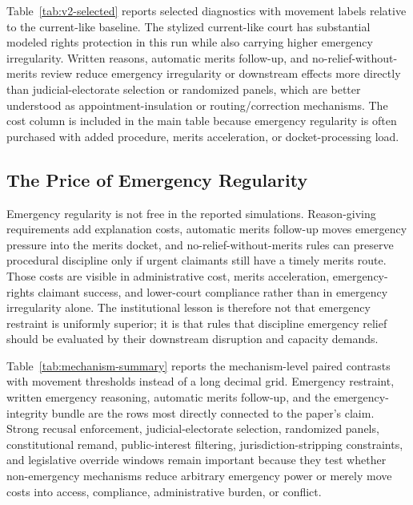 \documentclass[
    journal=jlc,
    manuscript=research-article,
    year=2026,
  ]{cup-journal}
\begin{document}


Table~\ref{tab:v2-selected} reports selected diagnostics with movement labels relative to the current-like baseline. The stylized current-like court has substantial modeled rights protection in this run while also carrying higher emergency irregularity. Written reasons, automatic merits follow-up, and no-relief-without-merits review reduce emergency irregularity or downstream effects more directly than judicial-electorate selection or randomized panels, which are better understood as appointment-insulation or routing/correction mechanisms. The cost column is included in the main table because emergency regularity is often purchased with added procedure, merits acceleration, or docket-processing load.

\subsection{The Price of Emergency Regularity}

Emergency regularity is not free in the reported simulations. Reason-giving requirements add explanation costs, automatic merits follow-up moves emergency pressure into the merits docket, and no-relief-without-merits rules can preserve procedural discipline only if urgent claimants still have a timely merits route. Those costs are visible in administrative cost, merits acceleration, emergency-rights claimant success, and lower-court compliance rather than in emergency irregularity alone. The institutional lesson is therefore not that emergency restraint is uniformly superior; it is that rules that discipline emergency relief should be evaluated by their downstream disruption and capacity demands.



Table~\ref{tab:mechanism-summary} reports the mechanism-level paired contrasts with movement thresholds instead of a long decimal grid. Emergency restraint, written emergency reasoning, automatic merits follow-up, and the emergency-integrity bundle are the rows most directly connected to the paper's claim. Strong recusal enforcement, judicial-electorate selection, randomized panels, constitutional remand, public-interest filtering, jurisdiction-stripping constraints, and legislative override windows remain important because they test whether non-emergency mechanisms reduce arbitrary emergency power or merely move costs into access, compliance, administrative burden, or conflict.
\end{document}
